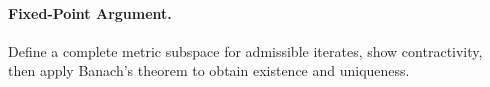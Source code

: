 \paragraph{Fixed-Point Argument.} Define a complete metric subspace for admissible iterates, show contractivity, then apply Banach's theorem to obtain existence and uniqueness.\n